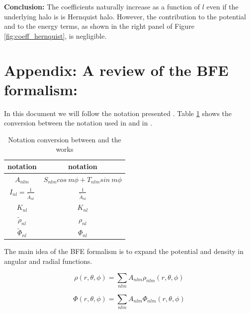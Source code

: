 \documentclass[14pt]{article}
\begin{document}
\textbf{Conclusion:} The coefficients naturally increase as a function of $l$
even if the underlying halo is is Hernquist halo. However, the contribution to 
the potential and to the energy terms, as shown in the right panel of Figure 
\ref{fig:coeff_hernquist}, is negligible. 






\appendix


\section*{Appendix: A review of the BFE formalism:}

In this document we will follow the notation presented \cite{Lowing11}. Table
\ref{tab:conversion} shows the conversion between the notation used in \cite{Hernquist92} and
in \cite{Lowing11}.

\begin{table}[h]
  \centering
  \begin{tabular}{c  c}
    \hline
    \hline
    \cite{Hernquist92} notation & \cite{Lowing11} notation \\
    \hline
    $A_{nlm}$ & $S_{nlm} cos\ m\phi + T_{nlm}sin\ m\phi $\\
    $I_{nl} = \frac{1}{\tilde{A}_{nl}}$ & $\frac{1}{\tilde{A}_{nl}}$\\
    $K_{nl}$ & $K_{nl}$ \\
    $\tilde{\rho}_{nl}$ & $\rho_{nl}$\\
    $\tilde{\Phi}_{nl}$ & $\Phi_{nl}$\\
    \hline
    \hline
  \end{tabular}
  \caption{Notation conversion between \cite{Hernquist92} and the
  \cite{Lowing11} works}\label{tab:conversion}
\end{table}



The main idea of the BFE formalism is to expand the potential and density in
angular and radial functions. 


\begin{equation}
    \rho(r, \theta, \phi) = \sum_{nlm} A_{nlm}\rho_{nlm}(r, \theta, \phi)
\end{equation}

\begin{equation}
    \Phi(r, \theta, \phi) = \sum_{nlm} A_{nlm}\Phi_{nlm}(r, \theta, \phi)
\end{equation}
\end{document}
